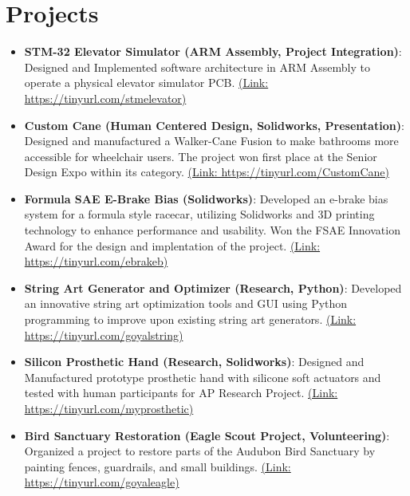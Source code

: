\documentclass[letterpaper,10pt]{article}
\newcommand{\resumeItem}[2]{
  \item\small{
    \textbf{#1}{: #2 \vspace{-2pt}}
  }
}
\newcommand{\resumeSubItem}[2]{\resumeItem{#1}{#2}\vspace{-3pt}}
\newcommand{\resumeSubHeadingListStart}{\begin{itemize}[leftmargin=*]}
\newcommand{\resumeSubHeadingListEnd}{\end{itemize}}
\begin{document}
\section{Projects}
  \resumeSubHeadingListStart
    \resumeSubItem{STM-32 Elevator Simulator (ARM Assembly, Project Integration)}
    {Designed and Implemented software architecture in ARM Assembly to operate a physical elevator simulator PCB. \href{https://tinyurl.com/stmelevator}{(Link: https://tinyurl.com/stmelevator)}}
\vspace{2pt}
    \resumeSubItem{Custom Cane (Human Centered Design, Solidworks, Presentation)}
    {Designed and manufactured a Walker-Cane Fusion to make bathrooms more accessible for wheelchair users. The project won first place at the Senior Design Expo within its category. \href{https://tinyurl.com/CustomCane}{(Link: https://tinyurl.com/CustomCane)}}
\vspace{2pt}
    \resumeSubItem{Formula SAE E-Brake Bias (Solidworks)}
    {Developed an e-brake bias system for a formula style racecar, utilizing Solidworks and 3D printing technology to enhance performance and usability. Won the FSAE Innovation Award for the design and implentation of the project. \href{https://tinyurl.com/ebrakeb}{(Link: https://tinyurl.com/ebrakeb)}}
\vspace{2pt}
    \resumeSubItem{String Art Generator and Optimizer (Research, Python)}
    {Developed an innovative string art optimization tools and GUI using Python programming to improve upon existing string art generators. \href{https://tinyurl.com/goyalstring}{(Link: https://tinyurl.com/goyalstring)}}
\vspace{2pt}
    \resumeSubItem{Silicon Prosthetic Hand (Research, Solidworks)}
    {Designed and Manufactured prototype prosthetic hand with silicone soft actuators and tested with human participants for AP Research Project. \href{https://tinyurl.com/myprosthetic}{(Link: https://tinyurl.com/myprosthetic)}}
\vspace{2pt}
    \resumeSubItem{Bird Sanctuary Restoration (Eagle Scout Project, Volunteering)}
    {Organized a project to restore parts of the Audubon Bird Sanctuary by painting fences, guardrails, and small buildings. \href{https://tinyurl.com/goyaleagle}{(Link: https://tinyurl.com/goyaleagle)}}
  \resumeSubHeadingListEnd
\vspace{-5pt}
\end{document}
